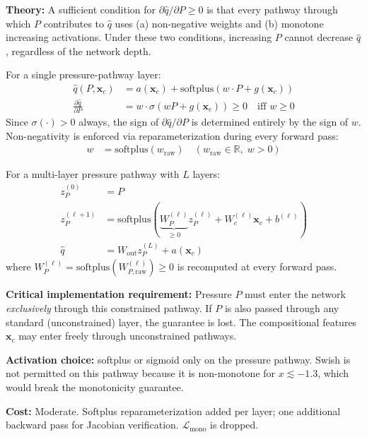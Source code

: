 \documentclass[12pt,a4paper]{article}
\begin{document}
\begin{mathbox}
\textbf{Theory:} A sufficient condition for $\partial\hat{q}/\partial P \geq 0$
is that every pathway through which $P$ contributes to $\hat{q}$
uses (a) non-negative weights and (b) monotone increasing activations.
Under these two conditions, increasing $P$ cannot decrease $\hat{q}$,
regardless of the network depth.

For a single pressure-pathway layer:
\begin{align}
\hat{q}(P, \mathbf{x}_c) &= a(\mathbf{x}_c)
  + \mathrm{softplus}(w \cdot P + g(\mathbf{x}_c)) \\[4pt]
\frac{\partial\hat{q}}{\partial P} &= w \cdot \sigma(wP + g(\mathbf{x}_c)) \geq 0
  \quad\text{iff } w \geq 0
\end{align}
Since $\sigma(\cdot) > 0$ always, the sign of $\partial\hat{q}/\partial P$
is determined entirely by the sign of $w$. Non-negativity is enforced via
reparameterization during every forward pass:
\begin{align}
w &= \mathrm{softplus}(w_{\text{raw}})
  \quad (w_{\text{raw}} \in \mathbb{R},\; w > 0)
\end{align}

For a multi-layer pressure pathway with $L$ layers:
\begin{align}
z_P^{(0)} &= P \\[2pt]
z_P^{(\ell+1)} &= \mathrm{softplus}\!\left(
  \underbrace{W_P^{(\ell)}}_{\geq 0} z_P^{(\ell)}
  + W_c^{(\ell)} \mathbf{x}_c + b^{(\ell)}\right) \\[4pt]
\hat{q} &= W_{\text{out}} z_P^{(L)} + a(\mathbf{x}_c)
\end{align}
where $W_P^{(\ell)} = \mathrm{softplus}(W_{P,\text{raw}}^{(\ell)}) \geq 0$
is recomputed at every forward pass.

\textbf{Critical implementation requirement:} Pressure $P$ must enter the
network \emph{exclusively} through this constrained pathway. If $P$ is
also passed through any standard (unconstrained) layer, the guarantee is
lost. The compositional features $\mathbf{x}_c$ may enter freely through
unconstrained pathways.

\textbf{Activation choice:} softplus or sigmoid only on the pressure
pathway. Swish is not permitted on this pathway because it is non-monotone
for $x \lesssim -1.3$, which would break the monotonicity guarantee.

\textbf{Cost:} Moderate. Softplus reparameterization added per layer;
one additional backward pass for Jacobian verification.
$\mathcal{L}_{\text{mono}}$ is dropped.
\end{mathbox}
\end{document}
